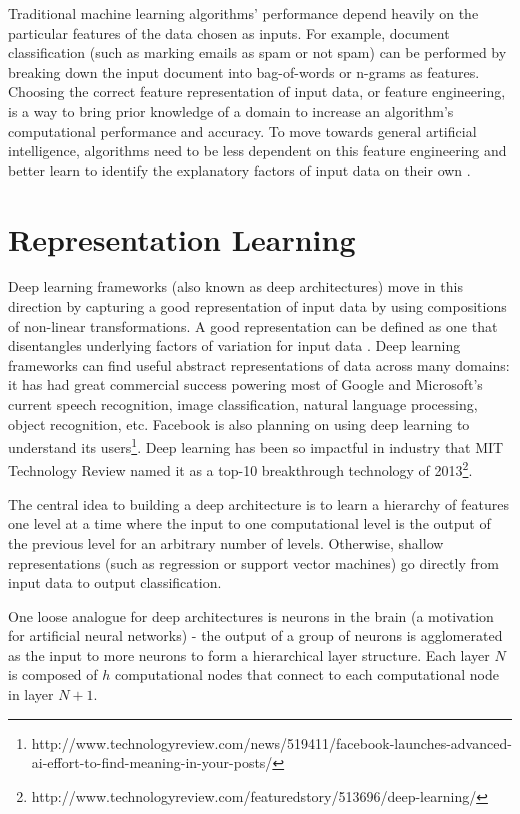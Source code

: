 Traditional machine learning algorithms' performance depend heavily on the particular features of the data chosen as inputs. For example, document classification (such as marking emails as spam or not spam) can be performed by breaking down the input document into bag-of-words or n-grams as features. Choosing the correct feature representation of input data, or feature engineering, is a way to bring prior knowledge of a domain to increase an algorithm's computational performance and accuracy. To move towards general artificial intelligence, algorithms need to be less dependent on this feature engineering and better learn to identify the explanatory factors of input data on their own \cite{bengio12}.

\section{Representation Learning}
Deep learning frameworks (also known as deep architectures) move in this direction by capturing a good representation of input data by using compositions of non-linear transformations. A good representation can be defined as one that disentangles underlying factors of variation for input data \cite{bengio13}. Deep learning frameworks can find useful abstract representations of data across many domains: it has had great commercial success powering most of Google and Microsoft's current speech recognition, image classification, natural language processing, object recognition, etc. Facebook is also planning on using deep learning to understand its users\footnote{http://www.technologyreview.com/news/519411/facebook-launches-advanced-ai-effort-to-find-meaning-in-your-posts/}. Deep learning has been so impactful in industry that MIT Technology Review named it as a top-10 breakthrough technology of 2013\footnote{http://www.technologyreview.com/featuredstory/513696/deep-learning/}.

The central idea to building a deep architecture is to learn a hierarchy of features one level at a time where the input to one computational level is the output of the previous level for an arbitrary number of levels. Otherwise, shallow representations (such as regression or support vector machines) go directly from input data to output classification.

One loose analogue for deep architectures is neurons in the brain (a motivation for artificial neural networks) - the output of a group of neurons is agglomerated as the input to more neurons to form a hierarchical layer structure. Each layer \(N\) is composed of \(h\) computational nodes that connect to each computational node in layer \(N+1\).

